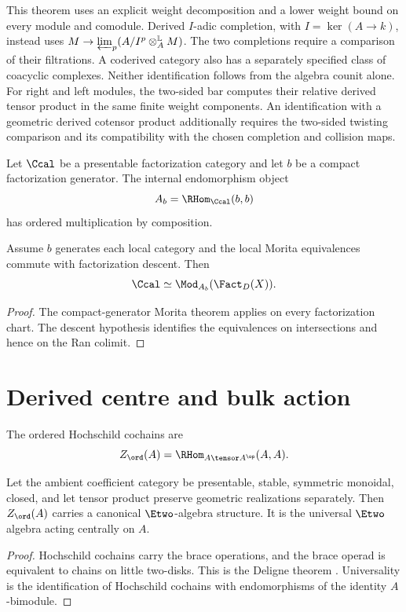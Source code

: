 This theorem uses an explicit weight decomposition and a lower weight bound on every module and comodule.
Derived $I$-adic completion, with $I=\ker(A\to k)$, instead uses
$M\to\varprojlim_p(A/I^p\otimes_A^{\mathbb L}M)$.
The two completions require a comparison of their filtrations.
A coderived category also has a separately specified class of coacyclic complexes.
Neither identification follows from the algebra counit alone.
For right and left modules, the two-sided bar computes their relative derived tensor product
in the same finite weight components.
An identification with a geometric derived cotensor product additionally requires
the two-sided twisting comparison and its compatibility with the chosen completion and collision maps.

Let $\Ccal$ be a presentable factorization category and let $b$ be a compact factorization generator. The internal endomorphism object
\[
 A_b=\RHom_{\Ccal}(b,b)
\]
has ordered multiplication by composition.

\begin{theorem}
Assume $b$ generates each local category and the local Morita equivalences commute with factorization descent. Then
\[
 \Ccal\simeq \Mod_{A_b}(\Fact_D(X)).
\]
\end{theorem}
\begin{proof}
The compact-generator Morita theorem applies on every factorization chart. The descent hypothesis identifies the equivalences on intersections and hence on the Ran colimit.
\end{proof}

\chapter{Derived centre and bulk action}
The ordered Hochschild cochains are
\[
 Z_{\ord}(A)=\RHom_{A\tensor A^{\op}}(A,A).
\]

\begin{theorem}
Let the ambient coefficient category be presentable, stable, symmetric monoidal, closed, and let tensor product preserve geometric realizations separately. Then $Z_{\ord}(A)$ carries a canonical $\Etwo$-algebra structure. It is the universal $\Etwo$ algebra acting centrally on $A$.
\end{theorem}
\begin{proof}
Hochschild cochains carry the brace operations, and the brace operad is equivalent to chains on little two-disks. This is the Deligne theorem \cite{McClureSmith,KontsevichSoibelmanDeligne}. Universality is the identification of Hochschild cochains with endomorphisms of the identity $A$-bimodule.
\end{proof}

